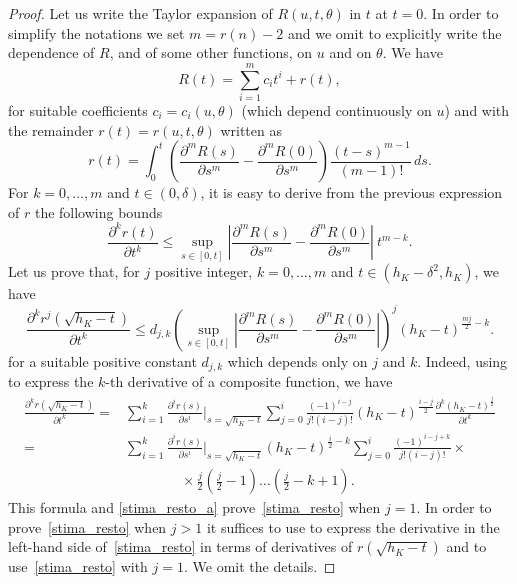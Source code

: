 \documentclass[a4paper]{amsart}
\theoremstyle{definition}
\numberwithin{equation}{section}
\begin{document}
\begin{proof}
Let us write the Taylor expansion of $R(u,t,\theta)$ in $t$ at $t=0$. In order to simplify the notations we set $m={{r(n)}}-2$ and we omit to explicitly write the dependence of $R$, and of some other functions, on $u$ and on ${{\theta}}$.
We have
\begin{equation}\label{taylor_exp_R}
 R(t)=\sum_{i=1}^{m}c_i t^i+r(t),
\end{equation}
for suitable coefficients $c_i=c_i(u,{{\theta}})$ (which depend continuously on $u$) and with the remainder  $r(t)=r(u,t,{{\theta}})$ written as
\[
r(t)=\int_0^t\left(\frac{{{\partial}}^mR(s)}{{{\partial}} s^m}-\frac{{{\partial}}^mR(0)}{{{\partial}} s^m}\right)\frac{(t-s)^{m-1}}{(m-1)!}\, ds.
\]
For $k=0,\dots,m$ and $t\in(0,{{\delta}})$, it is easy to derive from the previous expression of $r$ the following bounds
\begin{equation}\label{stima_resto_a}
 \frac{{{\partial}}^k r(t)}{{{\partial}} t^k}\leq \sup_{s\in[0,t]} \left|\frac{{{\partial}}^mR(s)}{{{\partial}} s^m}-\frac{{{\partial}}^mR(0)}{{{\partial}} s^m}\right|\ t^{m-k}.
\end{equation}
Let us prove that, for $j$ positive integer, $k=0,\dots,m$  and $t\in(h_K-{{\delta}}^2,h_K)$, we have
\begin{equation}\label{stima_resto}
 \frac{{{\partial}}^k r^j\left(\sqrt{h_K-t}\right)}{{{\partial}} t^k}\leq
 d_{j,k} \left(\sup_{s\in[0,t]} \left|\frac{{{\partial}}^mR(s)}{{{\partial}} s^m}-\frac{{{\partial}}^mR(0)}{{{\partial}} s^m}\right|\right)^j(h_K-t)^{\frac{m j}2-k}.
\end{equation}
for a suitable positive constant $d_{j,k}$ which depends only on $j$ and $k$.
Indeed, using  \cite[Formula $3_n$]{McK56} to express the $k$-th derivative of a composite function, we have 
\begin{align*}
\frac{{{\partial}}^k r\left(\sqrt{h_K-t}\right)}{{{\partial}} t^k}=&
\sum_{i=1}^k \frac{{{\partial}}^i r(s)}{{{\partial}} s^i}|_{s=\sqrt{h_K-t}}\sum_{j=0}^i \frac{(-1)^{i-j}}{j! (i-j)!}\left(h_K-t\right)^\frac{i-j}2\frac{{{\partial}}^k \left(h_K-t\right)^\frac{j}2}{{{\partial}} t^k}\\
=&\sum_{i=1}^k  \frac{{{\partial}}^i r(s)}{{{\partial}} s^i}|_{s=\sqrt{h_K-t}}(h_K-t)^{\frac{i}2-k}\sum_{j=0}^i \frac{(-1)^{i-j+k}}{j! (i-j)!}\times\\
&\quad\quad\quad\quad\times\frac{j}2\left(\frac{j}2-1\right)\dots\left(\frac{j}2-k+1\right).
\end{align*}
This formula and \eqref{stima_resto_a} prove~\eqref{stima_resto} when $j=1$. In order to prove~\eqref{stima_resto} when $j>1$ it suffices to use \cite[Formula $9_n$]{McK56} to express the derivative in the left-hand side of~\eqref{stima_resto} in terms of derivatives of $r(\sqrt{h_K-t})$ and to use~\eqref{stima_resto} with $j=1$. We omit the details.


\end{proof}
\end{document}
